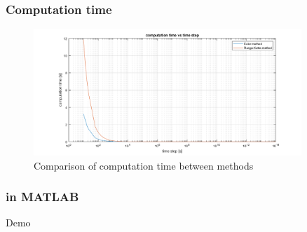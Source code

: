 \documentclass[english,12pt,a4paper]{beamer}
\begin{document}
	\begin{frame}
		\frametitle{Computation time}
		\begin{figure}[h!]
			\centering
			\includegraphics[width = 0.9\textwidth]{time_comp.png}
			\caption{Comparison of computation time between methods}
		\end{figure}
	\end{frame}
	
	\begin{frame}
		\frametitle{in MATLAB}
		
	\end{frame}
	
	\begin{frame}
		\Large Demo
	\end{frame}
		
\end{document}
